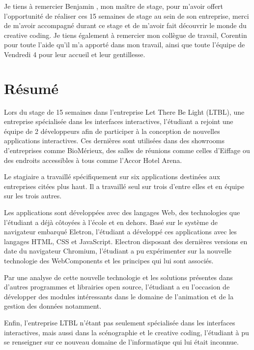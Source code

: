 \documentclass{article}
\begin{document}
    Je tiens à remercier Benjamin , mon maître de stage, pour m'avoir offert l'opportunité de réaliser ces 15 semaines de stage au sein de son entreprise, merci de m'avoir accompagné durant ce stage et de m'avoir fait découvrir le monde du creative coding.
    Je tiens également à remercier mon collègue de travail, Corentin  pour toute l'aide qu'il m'a apporté dans mon travail, ainsi que toute l'équipe de Vendredi 4 pour leur accueil et leur gentillesse.

    \vspace{\fill}

    \clearpage

    \section{Résumé}

    Lors du stage de 15 semaines dans l'entreprise Let There Be Light (LTBL), une entreprise spécialisée dans les interfaces interactives, l'étudiant a rejoint une équipe de 2 développeurs afin de participer à la conception de nouvelles applications interactives.
    Ces dernières sont utilisées dans des showrooms d'entreprises comme BioMérieux, des salles de réunions comme celles d'Eiffage ou des endroits accessibles à tous comme l'Accor Hotel Arena.

    Le stagiaire a travaillé spécifiquement sur six applications destinées aux entreprises citées plus haut.
    Il a travaillé seul sur trois d'entre elles et en équipe sur les trois autres.

    Les applications sont développées avec des langages Web, des technologies que l'étudiant a déjà côtoyées à l'école et en dehors.
    Basé sur le système de navigateur embarqué Eletron, l'étudiant a développé ces applications avec les langages HTML, CSS et JavaScript.
    Electron disposant des dernières versions en date du navigateur Chromium, l'étudiant a pu expérimenter sur la nouvelle technologie des WebComponents et les principes qui lui sont associés.

    Par une analyse de cette nouvelle technologie et les solutions présentes dans d'autres programmes et librairies open source, l'étudiant a eu l'occasion de développer des modules intéressants dans le domaine de l'animation et de la gestion des données notamment.

    Enfin, l'entreprise LTBL n'étant pas seulement spécialisée dans les interfaces interactives, mais aussi dans la scénographie et le creative coding,
    l'étudiant à pu se renseigner sur ce nouveau domaine de l'informatique qui lui était inconnue.
\end{document}
